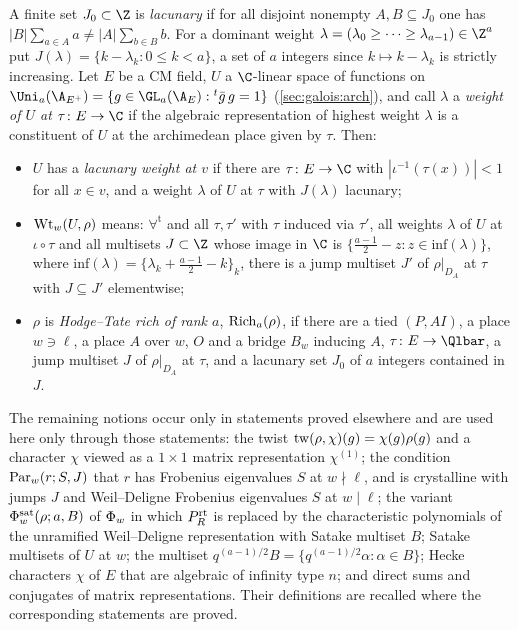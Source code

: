 \begin{definition}\label{def:pf:steps2:lac}
A finite set $J_0\subset\Z$ is \emph{lacunary} if for all disjoint nonempty $A,B\subseteq J_0$ one
has $|B|\sum_{a\in A}a\ne|A|\sum_{b\in B}b$. For a dominant weight
$\lambda=(\lambda_0\ge\dots\ge\lambda_{a-1})\in\Z^a$ put $J(\lambda)=\{k-\lambda_k:0\le k<a\}$, a set
of $a$ integers since $k\mapsto k-\lambda_k$ is strictly increasing. Let $E$ be a CM field, $U$ a
$\C$-linear space of functions on $\Uni_a(\A_{E^+})=\{g\in\GL_a(\A_E):{}^t\bar g\,g=1\}$
(\cref{sec:galois:arch}), and call $\lambda$ a \emph{weight of $U$ at $\tau\colon E\to\C$} if the
algebraic representation of highest weight $\lambda$ is a constituent of $U$ at the archimedean
place given by $\tau$. Then:
\begin{itemize}[nosep]
\item $U$ has a \emph{lacunary weight at $v$} if there are $\tau\colon E\to\C$ with
  $|\iota^{-1}(\tau(x))|<1$ for all $x\in v$, and a weight $\lambda$ of $U$ at $\tau$ with $J(\lambda)$
  lacunary;
\item $\mathrm{Wt}_w(U,\rho)$ means: $\forall^{\mathrm t}$ and all $\tau,\tau'$ with $\tau$ induced via
  $\tau'$, all weights $\lambda$ of $U$ at $\iota\circ\tau$ and all multisets $J\subset\Z$ whose image
  in $\C$ is $\{\frac{a-1}2-z:z\in\mathrm{inf}(\lambda)\}$, where
  $\mathrm{inf}(\lambda)=\{\lambda_k+\frac{a-1}2-k\}_k$, there is a jump multiset $J'$ of
  $\rho|_{D_A}$ at $\tau$ with $J\subseteq J'$ elementwise;
\item $\rho$ is \emph{Hodge--Tate rich of rank $a$}, $\mathrm{Rich}_a(\rho)$, if there are a tied
  $(P,AI)$, a place $w\ni\ell$, a place $A$ over $w$, $O$ and a bridge $B_w$ inducing $A$,
  $\tau\colon E\to\Qlbar$, a jump multiset $J$ of $\rho|_{D_A}$ at $\tau$, and a lacunary set $J_0$
  of $a$ integers contained in $J$.
\end{itemize}
\end{definition}

The remaining notions occur only in statements proved elsewhere and are used here only through
those statements: the twist $\mathrm{tw}(\rho,\chi)(g)=\chi(g)\rho(g)$ and a character $\chi$ viewed as
a $1\times1$ matrix representation $\chi^{(1)}$; the condition $\mathrm{Par}_w(r;S,J)$ that $r$ has
Frobenius eigenvalues $S$ at $w\nmid\ell$, and is crystalline with jumps $J$ and Weil--Deligne
Frobenius eigenvalues $S$ at $w\mid\ell$; the variant $\Phi^{\mathrm{sat}}_w(\rho;a,B)$ of
$\Phi_w$ in which $P^{\mathrm{rt}}_R$ is replaced by the characteristic polynomials of the
unramified Weil--Deligne representation with Satake multiset $B$; Satake multisets of $U$ at $w$;
the multiset $q^{(a-1)/2}B=\{q^{(a-1)/2}\alpha:\alpha\in B\}$; Hecke characters $\chi$ of $E$
that are algebraic of infinity type $n$; and direct sums and conjugates of matrix representations.
Their definitions are recalled where the corresponding statements are proved.

